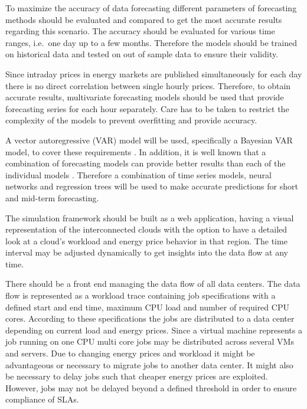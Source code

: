 \documentclass[a4paper]{article}
\begin{document}

To maximize the accuracy of data forecasting different parameters of forecasting methods should be evaluated and compared to get the most accurate results regarding this scenario. The accuracy should be evaluated for various time ranges, i.e.\ one day up to a few months. Therefore the models should be trained on historical data and tested on out of sample data to ensure their validity. 

Since intraday prices in energy markets are published simultaneously for each day there is no direct correlation between single hourly prices. Therefore, to obtain accurate results, multivariate forecasting models should be used that provide forecasting series for each hour separately. Care has to be taken to restrict the complexity of the models to prevent overfitting and provide accuracy. 

A vector autoregressive (VAR) model will be used, specifically a Bayesian VAR model, to cover these requirements \cite{raviv2013forecasting}. 
In addition, it is well known that a combination of forecasting models can provide better results than each of the individual models \cite{raviv2013forecasting}. Therefore a combination of time series models, neural networks and regression trees will be used to make accurate predictions for short and mid-term forecasting. 

The simulation framework should be built as a web application, having a visual representation of the interconnected clouds with the option to have a detailed look at a cloud’s workload and energy price behavior in that region. The time interval may be adjusted dynamically to get insights into the data flow at any time.

There should be a front end managing the data flow of all data centers. The data flow is represented as a workload trace containing job specifications with a defined start and end time, maximum CPU load and number of required CPU cores. According to these specifications the jobs are distributed to a data center depending on current load and energy prices. Since a virtual machine represents a job running on one CPU multi core jobs may be distributed across several VMs and servers. Due to changing energy prices and workload it might be advantageous or necessary to migrate jobs to another data center. It might also be necessary to delay jobs such that cheaper energy prices are exploited. However, jobs may not be delayed beyond a defined threshold in order to ensure compliance of SLAs. 
\end{document}
